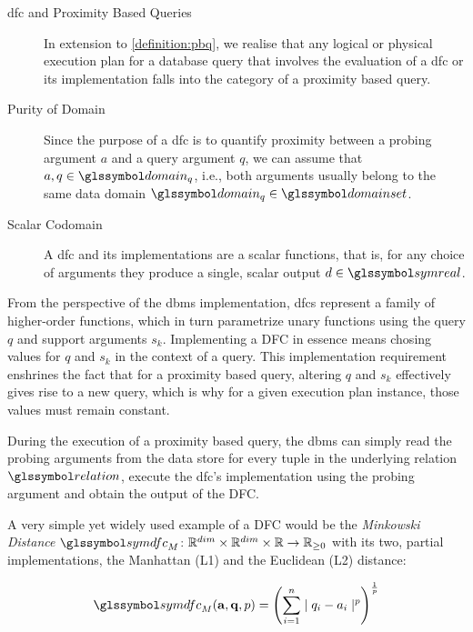 \begin{description}
    \item[\acrshort{dfc} and Proximity Based Queries] In extension to \cref{definition:pbq}, we realise that any logical or physical execution plan for a database query that involves the evaluation of a \acrshort{dfc} or its implementation falls into the category of a proximity based query.

    \item[Purity of Domain] Since the purpose of a \acrshort{dfc} is to quantify proximity between a probing argument $a$ and a query argument $q$, we can assume that $a, q \in \domain_q$, i.e., both arguments usually belong to the same data domain $\domain_q \in \domainset$.

    \item[Scalar Codomain] A \acrshort{dfc} and its implementations are a scalar functions, that is, for any choice of arguments they produce a single, scalar output $d \in \symreal$. 
\end{description}

From the perspective of the \acrshort{dbms} implementation, \acrshort{dfc}s represent a family of higher-order functions, which in turn parametrize unary functions using the query $q$ and support arguments $s_k$. Implementing a DFC in essence means chosing values for $q$ and $s_k$ in the context of a query. This implementation requirement enshrines the fact that for a proximity based query, altering $q$ and $s_k$ effectively gives rise to a new query, which is why for a given execution plan instance, those values must remain constant. 

During the execution of a proximity based query, the \acrshort{dbms} can simply read the probing arguments from the data store for every tuple in the underlying relation $\relation$, execute the \acrshort{dfc}'s implementation using the probing argument and obtain the output of the DFC.

A very simple yet widely used example of a DFC would be the \emph{Minkowski Distance} $\symdfc_{M} \colon \mathbb{R}^{dim} \times \mathbb{R}^{dim} \times \mathbb{R} \to \mathbb{R}_{\geq 0}$ with its two, partial implementations, the Manhattan (L1) and the Euclidean (L2) distance:

\begin{equation}
    \symdfc_{M}(\mathbf{a},\mathbf{q},p) = \left(\sum_{i=1}^{n} \mid q_i - a_i \mid^p\right)^{\frac{1}{p}}
\end{equation}

